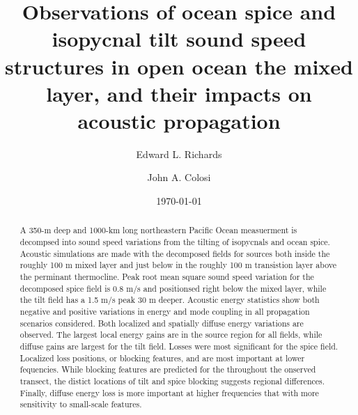 \documentclass[preprint,NumberedRefs]{JASA}
\begin{document}
\title[Mixed layer tilt and spice]{Observations of ocean spice and isopycnal tilt sound speed structures in open ocean the mixed layer, and their impacts on acoustic propagation}
\author{Edward L. Richards}
\author{John A. Colosi}


\date{\today}

\begin{abstract}
A 350-m deep and 1000-km long northeastern Pacific Ocean measuerment is decompsed into sound speed variations from the tilting of isopycnals and ocean spice. Acoustic simulations are made with the decomposed fields for sources both inside the roughly 100 m mixed layer and just below in the roughly 100 m transistion layer above the perminant thermocline. Peak root mean square sound speed variation for the decomposed spice field is 0.8 m/s and positionsed right below the mixed layer, while the tilt field has a 1.5 m/s peak 30 m deeper. Acoustic energy statistics show both negative and positive variations in energy and mode coupling in all propagation scenarios considered. Both localized and spatially diffuse energy variations are observed. The largest local energy gains are in the source region for all fields, while diffuse gains are largest for the tilt field. Losses were most significant for the spice field. Localized loss positions, or blocking features, and are most important at lower fequencies. While blocking features are predicted for the throughout the onserved transect, the distict locations of tilt and spice blocking suggests regional differences. Finally, diffuse energy loss is more important at higher frequencies that with more sensitivity to small-scale features.

\end{abstract}

\maketitle
\end{document}
